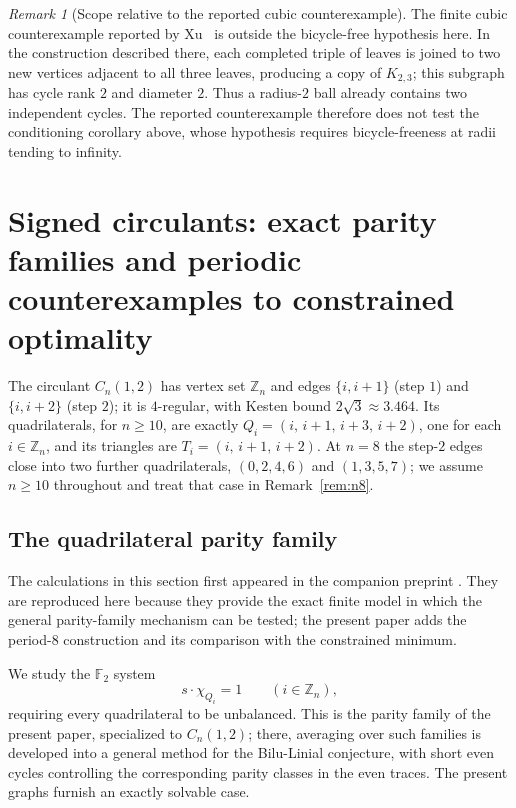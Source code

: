 \documentclass[11pt]{article}
\theoremstyle{remark}
\newtheorem{remark}[lemma]{Remark}
\newcommand{\F}{\mathbb{F}}
\begin{document}
\begin{remark}[Scope relative to the reported cubic counterexample]
The finite cubic counterexample reported by Xu~\cite{xu26counter} is outside the
bicycle-free hypothesis here. In the construction described there, each completed
triple of leaves is joined to two new vertices adjacent to all three leaves, producing
a copy of $K_{2,3}$; this subgraph has cycle rank $2$ and diameter $2$. Thus a radius-$2$
ball already contains two independent cycles. The reported counterexample therefore does
not test the conditioning corollary above, whose hypothesis requires bicycle-freeness at
radii tending to infinity.
\end{remark}

\section{Signed circulants: exact parity families and periodic counterexamples to constrained optimality}\label{sec:circulants}

The circulant $C_n(1,2)$ has vertex set $\mathbb Z_n$ and edges
$\{i,i{+}1\}$ (step $1$) and $\{i,i{+}2\}$ (step $2$); it is
$4$-regular, with Kesten bound $2\sqrt3\approx3.464$. Its
quadrilaterals, for $n\ge10$, are exactly
$Q_i=(i,\,i{+}1,\,i{+}3,\,i{+}2)$, one for each $i\in\mathbb Z_n$, and
its triangles are $T_i=(i,\,i{+}1,\,i{+}2)$. At $n=8$ the step-$2$
edges close into two further quadrilaterals, $(0,2,4,6)$ and
$(1,3,5,7)$; we assume $n\ge10$ throughout and treat that case in
Remark~\ref{rem:n8}.

\subsection{The quadrilateral parity family}

The calculations in this section first appeared in the companion preprint
\cite{companion}. They are reproduced here because they provide the exact
finite model in which the general parity-family mechanism can be tested;
the present paper adds the period-$8$ construction and its comparison with
the constrained minimum.

We study the $\F_2$ system
\begin{equation}\label{eq:circ-system}
s\cdot\chi_{Q_i}=1\qquad(i\in\mathbb Z_n),
\end{equation}
requiring every quadrilateral to be unbalanced. This is the parity
family of the present paper, specialized to
$C_n(1,2)$; there, averaging over such families is developed into a
general method for the Bilu-Linial conjecture, with short even cycles
controlling the corresponding parity classes in the even traces. The
present graphs furnish an exactly solvable case.
\end{document}
